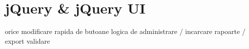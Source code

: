 \section{jQuery \& jQuery UI}
	orice modificare rapida de butoane
	logica de administrare / incarcare rapoarte / export 
	validare